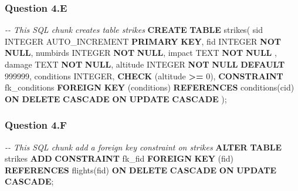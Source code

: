 \documentclass[
]{article}
\newenvironment{Shaded}{\begin{snugshade}}{\end{snugshade}}
\newcommand{\CommentTok}[1]{\textcolor[rgb]{0.56,0.35,0.01}{\textit{#1}}}
\newcommand{\DataTypeTok}[1]{\textcolor[rgb]{0.13,0.29,0.53}{#1}}
\newcommand{\DecValTok}[1]{\textcolor[rgb]{0.00,0.00,0.81}{#1}}
\newcommand{\KeywordTok}[1]{\textcolor[rgb]{0.13,0.29,0.53}{\textbf{#1}}}
\newcommand{\NormalTok}[1]{#1}
\newcommand{\OperatorTok}[1]{\textcolor[rgb]{0.81,0.36,0.00}{\textbf{#1}}}
\begin{document}
\hypertarget{question-4.e}{%
\subsubsection{Question 4.E}\label{question-4.e}}

\begin{Shaded}
\begin{Highlighting}[]
\CommentTok{{-}{-} This SQL chunk creates table strikes}
\KeywordTok{CREATE} \KeywordTok{TABLE}\NormalTok{ strikes(}
\NormalTok{sid }\DataTypeTok{INTEGER}\NormalTok{ AUTO\_INCREMENT }\KeywordTok{PRIMARY} \KeywordTok{KEY}\NormalTok{,}
\NormalTok{fid }\DataTypeTok{INTEGER} \KeywordTok{NOT} \KeywordTok{NULL}\NormalTok{,}
\NormalTok{numbirds }\DataTypeTok{INTEGER} \KeywordTok{NOT} \KeywordTok{NULL}\NormalTok{,}
\NormalTok{impact TEXT }\KeywordTok{NOT} \KeywordTok{NULL}\NormalTok{ ,}
\NormalTok{damage TEXT }\KeywordTok{NOT} \KeywordTok{NULL}\NormalTok{,}
\NormalTok{altitude }\DataTypeTok{INTEGER} \KeywordTok{NOT} \KeywordTok{NULL} \KeywordTok{DEFAULT} \DecValTok{999999}\NormalTok{,}
\NormalTok{conditions }\DataTypeTok{INTEGER}\NormalTok{,}
\KeywordTok{CHECK}\NormalTok{ (altitude }\OperatorTok{\textgreater{}=} \DecValTok{0}\NormalTok{),}
\KeywordTok{CONSTRAINT}\NormalTok{ fk\_conditions}
\KeywordTok{FOREIGN} \KeywordTok{KEY}\NormalTok{ (conditions) }\KeywordTok{REFERENCES}\NormalTok{ conditions(cid)}
\KeywordTok{ON} \KeywordTok{DELETE} \KeywordTok{CASCADE}
\KeywordTok{ON} \KeywordTok{UPDATE} \KeywordTok{CASCADE}
\NormalTok{);}
\end{Highlighting}
\end{Shaded}

\hypertarget{question-4.f}{%
\subsubsection{Question 4.F}\label{question-4.f}}

\begin{Shaded}
\begin{Highlighting}[]
\CommentTok{{-}{-} This SQL chunk add a foreign key constraint on strikes}
\KeywordTok{ALTER} \KeywordTok{TABLE}\NormalTok{ strikes}
\KeywordTok{ADD} \KeywordTok{CONSTRAINT}\NormalTok{ fk\_fid}
\KeywordTok{FOREIGN} \KeywordTok{KEY}\NormalTok{ (fid) }\KeywordTok{REFERENCES}\NormalTok{ flights(fid)}
\KeywordTok{ON} \KeywordTok{DELETE} \KeywordTok{CASCADE}
\KeywordTok{ON} \KeywordTok{UPDATE} \KeywordTok{CASCADE}\NormalTok{;}
\end{Highlighting}
\end{Shaded}
\end{document}

